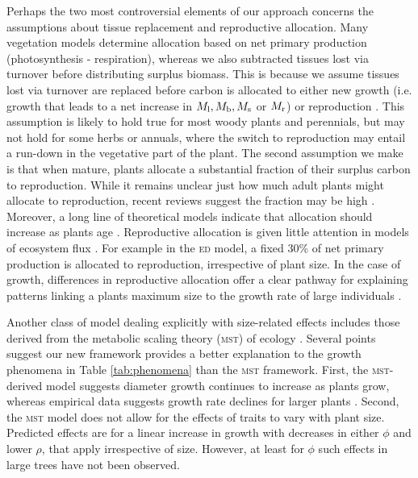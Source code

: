\documentclass[a4paper,11pt]{article}
\begin{document}
Perhaps the two most controversial elements of our approach concerns the assumptions about tissue replacement and reproductive allocation. Many vegetation models determine allocation based on net primary production (photosynthesis - respiration), whereas we also subtracted tissues lost via turnover before distributing surplus biomass. This is because we assume tissues lost via turnover are replaced before carbon is allocated to either new growth (i.e. growth that leads to a net increase in $M_{\rm l}, M_{\rm b}, M_{\rm s}$ or $M_{\rm r}$) or reproduction \citep{Thornley-2000}. This assumption is likely to hold true for most woody plants and perennials, but may not hold for some herbs or annuals, where the switch to reproduction may entail a run-down in the vegetative part of the plant. The second assumption we make is that when mature, plants allocate a substantial fraction of their surplus carbon to reproduction. While it remains unclear just how much adult plants might allocate to reproduction, recent reviews suggest the fraction may be high \citep{Thomas-2011, Wenk-2015}. Moreover, a long line of theoretical models indicate that allocation should increase as plants age \citep[reviewed by ][]{Wenk-2015}. Reproductive allocation is given little attention in models of ecosystem flux \citep[e.g.][]{Sitch-2008, DeKauwe-2014}. For example in the \textsc{ed} model, a fixed 30\% of net primary production is allocated to reproduction, irrespective of plant size. In the case of growth, differences in reproductive allocation offer a clear pathway for explaining patterns linking a plants maximum size to the growth rate of large individuals \citep[e.g.][]{Wright-2010}.

Another class of model dealing explicitly with size-related effects includes those derived from the metabolic scaling theory (\textsc{mst}) of ecology \citep{Enquist-1999, Enquist-2007}. Several points suggest our new framework provides a better explanation to the growth phenomena in Table \ref{tab:phenomena} than the \textsc{mst} framework. First, the \textsc{mst}-derived model suggests diameter growth continues to increase as plants grow, whereas empirical data suggests growth rate declines for larger plants \citep{Canham-2004, Canham-2006, Herault-2011}. Second, the \textsc{mst} model does not allow for the effects of traits to vary with plant size. Predicted effects are for a linear increase in growth with decreases in either $\phi$ and lower $\rho$, that apply irrespective of size. However, at least for $\phi$ such effects in large trees have not been observed.
\end{document}
